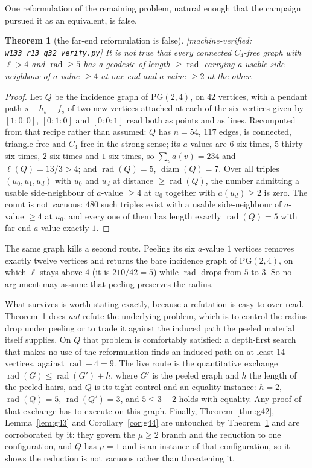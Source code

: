 \documentclass[11pt]{article}
\theoremstyle{plain}
\newtheorem{theorem}{Theorem}[section]
\theoremstyle{definition}
\theoremstyle{remark}
\numberwithin{equation}{section}
\newcommand{\rad}{\operatorname{rad}}
\newcommand{\diam}{\operatorname{diam}}
\newcommand{\statusbox}[1]{{\small\sloppy\textsf{[#1]}}}
\newcommand{\MV}[1]{\statusbox{machine-verified: \texttt{#1}}}
\begin{document}
One reformulation of the remaining problem, natural enough that the campaign pursued it as an
equivalent, is false.

\begin{theorem}[the far-end reformulation is false]\label{thm:g48}
\MV{w133\_r13\_q32\_verify.py}
It is not true that every connected $C_4$-free graph with $\ell > 4$ and $\rad \ge 5$ has a
geodesic of length $\ge \rad$ carrying a usable side-neighbour of $a$-value $\ge 4$ at one end
and $a$-value $\ge 2$ at the other.
\end{theorem}

\begin{proof}
Let $Q$ be the incidence graph of $\mathrm{PG}(2,4)$, on $42$ vertices, with a pendant path
$s - h_s - f_s$ of two new vertices attached at each of the six vertices given by
$[1{:}0{:}0]$, $[0{:}1{:}0]$ and $[0{:}0{:}1]$ read both as points and as lines. Recomputed
from that recipe rather than assumed: $Q$ has $n = 54$, $117$ edges, is connected,
triangle-free and $C_4$-free in the strong sense; its $a$-values are $6$ six times, $5$
thirty-six times, $2$ six times and $1$ six times, so $\sum_v a(v) = 234$ and
$\ell(Q) = 13/3 > 4$; and $\rad(Q) = 5$, $\diam(Q) = 7$. Over all triples $(u_0,u_1,u_d)$ with
$u_0$ and $u_d$ at distance $\ge \rad(Q)$, the number admitting a usable side-neighbour of
$a$-value $\ge 4$ at $u_0$ together with $a(u_d)\ge 2$ is zero. The count is not vacuous:
$480$ such triples exist with a usable side-neighbour of $a$-value $\ge 4$ at $u_0$, and every
one of them has length exactly $\rad(Q) = 5$ with far-end $a$-value exactly $1$.
\end{proof}

The same graph kills a second route. Peeling its six $a$-value $1$ vertices removes exactly
twelve vertices and returns the bare incidence graph of $\mathrm{PG}(2,4)$, on which $\ell$
stays above $4$ (it is $210/42 = 5$) while $\rad$ drops from $5$ to $3$. So no argument may
assume that peeling preserves the radius.

What survives is worth stating exactly, because a refutation is easy to over-read.
Theorem~\ref{thm:g48} does \emph{not} refute the underlying problem, which is to control the
radius drop under peeling or to trade it against the induced path the peeled material itself
supplies. On $Q$ that problem is comfortably satisfied: a depth-first search that makes no use
of the reformulation finds an induced path on at least $14$ vertices, against $\rad + 4 = 9$.
The live route is the quantitative exchange $\rad(G)\le \rad(G')+h$, where $G'$ is the peeled
graph and $h$ the length of the peeled hairs, and $Q$ is its tight control and an equality
instance: $h = 2$, $\rad(Q) = 5$, $\rad(Q') = 3$, and $5 \le 3+2$ holds with equality. Any
proof of that exchange has to execute on this graph. Finally, Theorem~\ref{thm:g42},
Lemma~\ref{lem:g43} and Corollary~\ref{cor:g44} are untouched by Theorem~\ref{thm:g48} and are
corroborated by it: they govern the $\mu \ge 2$ branch and the reduction to one configuration,
and $Q$ has $\mu = 1$ and is an instance of that configuration, so it shows the reduction is
not vacuous rather than threatening it.
\end{document}
